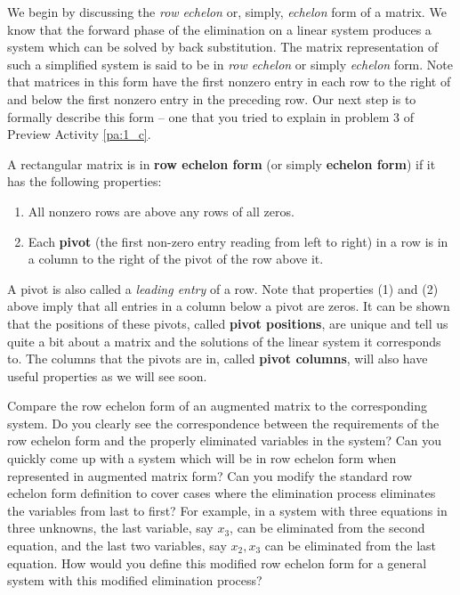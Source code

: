We begin by discussing the \emph{row echelon} or, simply, \emph{echelon} form of a matrix. We know that the forward phase of the elimination on a linear system produces a system which can be solved by back substitution. The matrix representation of such a simplified system is said to be in \emph{row echelon} or simply \emph{echelon} form. Note that matrices in this form have the first nonzero entry in each row to the right of and below the first nonzero entry in the preceding row. Our next step is to formally describe this form -- one that you tried to explain in problem 3 of Preview Activity \ref{pa:1_c}. 



\begin{definition} A rectangular matrix is in \textbf{row echelon form} (or simply \textbf{echelon form}) if it has the following properties:
        \begin{enumerate}
        \item All nonzero rows are above any rows of all zeros.
        \item Each \textbf{pivot} (the first non-zero entry reading from left to right) in a row is in a column to the right of the pivot of the row above it.
        \end{enumerate}
\end{definition}

A pivot is also called a \emph{leading entry} of a row. Note that properties (1) and (2) above imply that all entries in a column below a pivot are zeros. It can be shown that the positions of these pivots, called \textbf{pivot positions}, are unique and tell us quite a bit about a matrix and the solutions of the linear system it corresponds to. The columns that the pivots are in, called \textbf{pivot columns}, will also have useful properties as we will see soon.

\begin{reflect} Compare the row echelon form of an augmented matrix to the corresponding system. Do you clearly see the correspondence between the requirements of the row echelon form and the properly eliminated variables in the system? Can you quickly come up with a system which will be in row echelon form when represented in augmented matrix form? Can you modify the standard row echelon form definition to cover cases where the elimination process eliminates the variables from last to first? For example, in a system with three equations in three unknowns, the last variable, say $x_3$, can be eliminated from the second equation, and the last two variables, say $x_2, x_3$ can be eliminated from the last equation. How would you define this modified row echelon form for a general system with this modified elimination process?
\end{reflect}



